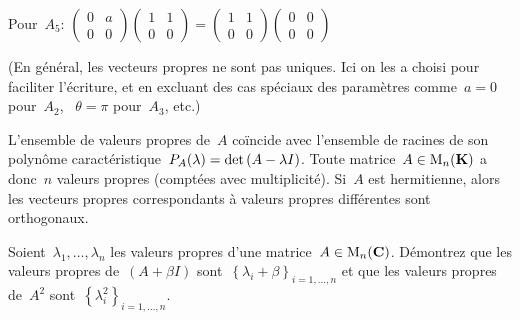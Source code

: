 {	Pour~$A_5$: \(
		\begin{pmatrix} 0 & a \\ 0 & 0 \end{pmatrix}
		\begin{pmatrix} 1 & 1 \\ 0 & 0 \end{pmatrix}
		=
		\begin{pmatrix} 1 & 1 \\ 0 & 0 \end{pmatrix}
		\begin{pmatrix} 0 & 0 \\ 0 & 0 \end{pmatrix}
	\)

	(En général, les vecteurs propres ne sont pas uniques.  Ici on les a choisi
	pour faciliter l'écriture, et en excluant des cas spéciaux des
	paramètres comme~$a=0$ pour~$A_2$, ~$\theta=\pi$ pour~$A_3$, etc.)
}

\begin{proposition}
	\label{prp:eigenalgebra}
	L'ensemble de valeurs propres de~$A$ coïncide avec l'ensemble de racines de
	son polynôme caractéristique~$P_A(\lambda)=\mathrm{det}\left(A-\lambda
	I\right)$.  Toute matrice~$A\in\mathrm{M}_n(\mathbf{K})$ a donc~$n$ valeurs propres (comptées
	avec multiplicité).  Si~$A$ est hermitienne, alors les vecteurs propres
	correspondants à valeurs propres différentes sont orthogonaux.
\end{proposition}

\begin{exercice}
	Soient~$\lambda_1,\ldots,\lambda_n$ les valeurs propres d'une
	matrice~$A\in\mathrm{M}_n(\mathbf{C})$.  Démontrez que les valeurs propres de~$(A+\beta I)$
	sont~$\left\{\lambda_i+\beta\right\}_{i=1,\ldots,n}$ et que les valeurs
	propres de~$A^2$ sont~$\left\{\lambda_i^2\right\}_{i=1,\ldots,n}$.
\end{exercice}

